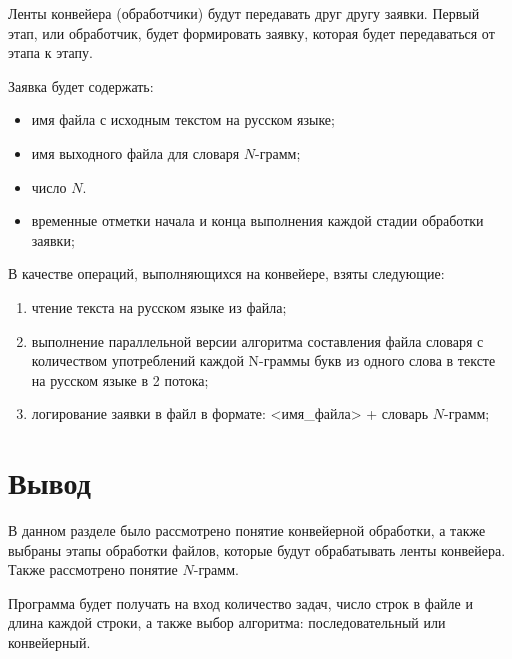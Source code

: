 Ленты конвейера (обработчики) будут передавать друг другу заявки. Первый этап, или обработчик, будет формировать заявку, которая будет передаваться от этапа к этапу.

Заявка будет содержать:

\begin{itemize}[label*=--]
	\item имя файла с исходным текстом на русском языке;
	\item имя выходного файла для словаря $N$-грамм;
	\item число $N$.
	\item временные отметки начала и конца выполнения каждой стадии обработки заявки;
\end{itemize}

В качестве операций, выполняющихся на конвейере, взяты следующие:

\begin{enumerate}[label={\arabic*)}]
	\item чтение текста на русском языке из файла;
	\item выполнение параллельной версии алгоритма составления файла словаря с количеством употреблений каждой N-граммы букв из одного слова в тексте на русском языке в 2 потока;
	\item логирование заявки в файл в формате: <имя\_файла> + словарь $N$-грамм;
\end{enumerate}

\section*{Вывод}

В данном разделе было рассмотрено понятие конвейерной обработки,
а также выбраны этапы обработки файлов, которые будут обрабатывать ленты конвейера. 
Также рассмотрено понятие $N$-грамм.

Программа будет получать на вход количество задач, число строк в файле и длина каждой строки, а также выбор алгоритма: последовательный или конвейерный.
